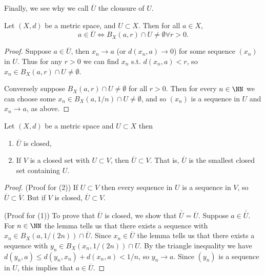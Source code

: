 Finally, we see why we call $\overline{U}$ the clousure of $U$.
\begin{lemma}
  Let $(X,d)$ be a metric space, and $U\subset X$. Then for all $a\in X$,
  \[a\in\overline{U} \iff B_X(a,r)\cap U \neq \emptyset \forall r>0.\]
  \label{<+label+>}
\end{lemma}
\begin{proof}
  Suppose $a\in\overline{U}$, then $x_n\to a$ (or $d(x_n,a)\to 0$) for some
  sequence $(x_n)$ in $U$. Thus for any $r>0$ we can find $x_n$ s.t.
  $d(x_n,a)<r$, so $x_n\in B_X(a,r)\cap U\neq\emptyset$.

  Conversely suppose $B_X(a,r)\cap U\neq \emptyset$ for all $r>0$. Then for
  every $n\in\NN$ we can choose some $x_n\in B_X(a,1/n)\cap U\neq \emptyset$,
  and so $(x_n)$ is a sequence in $U$ and $x_n\to a$, as above.
\end{proof}

\begin{proposition}
  Let $(X,d)$ be a metric space and $U\subset X$ then
  \begin{enumerate}
    \item $\overline{U}$ is closed,
    \item If $V$ is a closed set with $U\subset V$, then $\overline{U}\subset
      V$. That is, $\overline{U}$ is the smallest closed set containing $U$.
  \end{enumerate}
  \label{<+label+>}
\end{proposition}
\begin{proof}
  (Proof for (2)) If $U\subset V$ then every sequence in $U$ is a sequence in
  $V$, so $\overline{U}\subset\overline{V}$. But if $V$ is closed,
  $\overline{U}\subset V$.

  (Proof for (1)) To prove that $\overline{U}$ is closed, we show that
  $\overline{\overline{U}}=\overline{U}$. Suppose $a\in\overline{\overline{U}}$.
  For $n\in\NN$ the lemma tells us that there exists a sequence with $x_n\in
  B_X(a,1/(2n))\cap \overline{U}$. Since $x_n\in\overline{U}$ the lemma tells us
  that there exists a sequence with $y_n\in B_X(x_n,1/(2n))\cap U$. By the
  triangle inequality we have $d(y_n,a)\leq d(y_n,x_n)+d(x_n,a)<1/n$, so $y_n\to
  a$. Since $(y_n)$ is a sequence in $U$, this implies that
$a\in\overline{U}$.
\end{proof}
